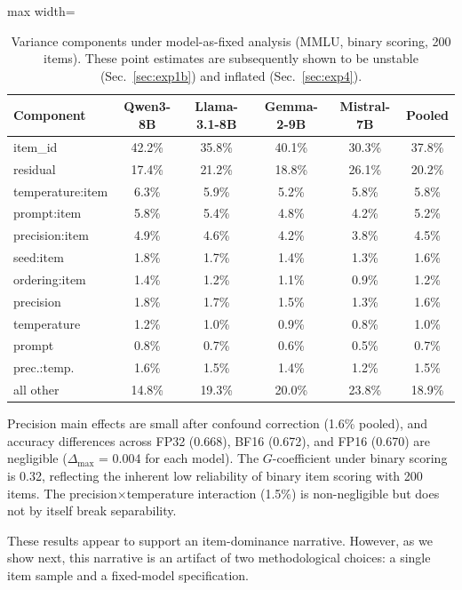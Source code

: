 \documentclass[11pt]{article}
\begin{document}
\begin{table}[t]
\centering
\caption{Variance components under model-as-fixed analysis (MMLU, binary scoring, 200 items). These point estimates are subsequently shown to be unstable (Sec.~\ref{sec:exp1b}) and inflated (Sec.~\ref{sec:exp4}).}
\label{tab:exp1_variance}
\begin{adjustbox}{max width=\textwidth}
\begin{tabular}{lccccc}
\toprule
Component & Qwen3-8B & Llama-3.1-8B & Gemma-2-9B & Mistral-7B & Pooled \\
\midrule
item\_id         & 42.2\% & 35.8\% & 40.1\% & 30.3\% & 37.8\% \\
residual         & 17.4\% & 21.2\% & 18.8\% & 26.1\% & 20.2\% \\
temperature:item & 6.3\%  & 5.9\%  & 5.2\%  & 5.8\%  & 5.8\%  \\
prompt:item      & 5.8\%  & 5.4\%  & 4.8\%  & 4.2\%  & 5.2\%  \\
precision:item   & 4.9\%  & 4.6\%  & 4.2\%  & 3.8\%  & 4.5\%  \\
seed:item        & 1.8\%  & 1.7\%  & 1.4\%  & 1.3\%  & 1.6\%  \\
ordering:item    & 1.4\%  & 1.2\%  & 1.1\%  & 0.9\%  & 1.2\%  \\
precision        & 1.8\%  & 1.7\%  & 1.5\%  & 1.3\%  & 1.6\%  \\
temperature      & 1.2\%  & 1.0\%  & 0.9\%  & 0.8\%  & 1.0\%  \\
prompt           & 0.8\%  & 0.7\%  & 0.6\%  & 0.5\%  & 0.7\%  \\
prec.:temp.      & 1.6\%  & 1.5\%  & 1.4\%  & 1.2\%  & 1.5\%  \\
all other        & 14.8\% & 19.3\% & 20.0\% & 23.8\% & 18.9\% \\
\bottomrule
\end{tabular}
\end{adjustbox}
\end{table}

Precision main effects are small after confound correction (1.6\% pooled), and accuracy differences across FP32 (0.668), BF16 (0.672), and FP16 (0.670) are negligible ($\Delta_{\max}$ = 0.004 for each model).
The $G$-coefficient under binary scoring is 0.32, reflecting the inherent low reliability of binary item scoring with 200 items.
The precision$\times$temperature interaction (1.5\%) is non-negligible but does not by itself break separability.

These results appear to support an item-dominance narrative.
However, as we show next, this narrative is an artifact of two methodological choices: a single item sample and a fixed-model specification.
\end{document}
